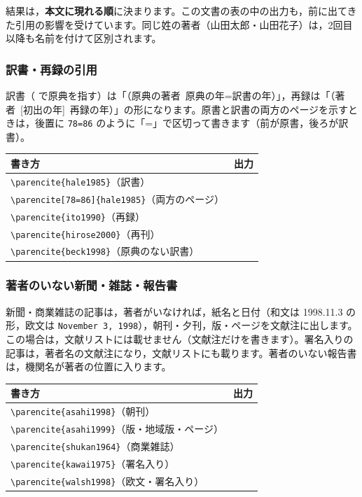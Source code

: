 \begin{caution}
結果は，\textbf{本文に現れる順}に決まります。この文書の表の中の出力も，前に出てきた引用の影響を受けています。同じ姓の著者（山田太郎・山田花子）は，2回目以降も名前を付けて区別されます。
\end{caution}

\subsubsection{訳書・再録の引用}\label{sec:citetrans}
訳書（ で原典を指す）は「（原典の著者\ 原典の年=訳書の年）」，再録は「（著者\ [初出の年]\ 再録の年）」の形になります。原書と訳書の両方のページを示すときは，後置に \texttt{78=86} のように「=」で区切って書きます（前が原書，後ろが訳書）。

\begin{center}\small
\begin{tabular}{@{}L{0.46\textwidth}L{0.42\textwidth}@{}}
\toprule
\textbf{書き方} & \textbf{出力} \\
\midrule
\verb|\parencite{hale1985}|（訳書）& \parencite{hale1985} \\
\verb|\parencite[78=86]{hale1985}|（両方のページ）& \parencite[78=86]{hale1985} \\
\verb|\parencite{ito1990}|（再録）& \parencite{ito1990} \\
\verb|\parencite{hirose2000}|（再刊）& \parencite{hirose2000} \\
\verb|\parencite{beck1998}|（原典のない訳書）& \parencite{beck1998} \\
\bottomrule
\end{tabular}
\end{center}

\subsubsection{著者のいない新聞・雑誌・報告書}
新聞・商業雑誌の記事は，著者がいなければ，紙名と日付（和文は 1998.11.3 の形，欧文は \texttt{November 3, 1998}），朝刊・夕刊，版・ページを文献注に出します。この場合は，文献リストには載せません（文献注だけを書きます）。署名入りの記事は，著者名の文献注になり，文献リストにも載ります。著者のいない報告書は，機関名が著者の位置に入ります。

\begin{center}\small
\begin{tabular}{@{}L{0.46\textwidth}L{0.42\textwidth}@{}}
\toprule
\textbf{書き方} & \textbf{出力} \\
\midrule
\verb|\parencite{asahi1998}|（朝刊）& \parencite{asahi1998} \\
\verb|\parencite{asahi1999}|（版・地域版・ページ）& \parencite{asahi1999} \\
\verb|\parencite{shukan1964}|（商業雑誌）& \parencite{shukan1964} \\
\verb|\parencite{kawai1975}|（署名入り）& \parencite{kawai1975} \\
\verb|\parencite{walsh1998}|（欧文・署名入り）& \parencite{walsh1998} \\
\bottomrule
\end{tabular}
\end{center}

